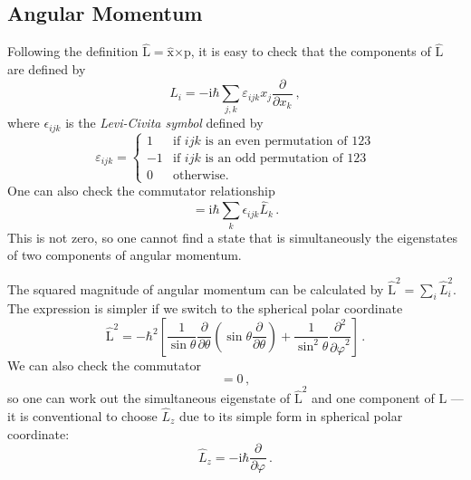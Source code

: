 \documentclass{article}
\theoremstyle{plain}\theoremheaderfont{\normalfont\itshape}\theorembodyfont{\rmfamily}\theoremseparator{.}\newtheorem*{rem}{Remark}\newtheorem*{ex}{Example}\newtheorem*{proof}{Proof}\newtheorem*{altp}{Alternative proof}
\theoremstyle{plain}\theoremheaderfont{\normalfont\bfseries}\theorembodyfont{\rmfamily}\theoremseparator{.}\newtheorem{thm}{Theorem}[section]\newtheorem{lem}[thm]{Lemma}\newtheorem{prop}[thm]{Proposition}\newtheorem*{cor}{Corollary}\newtheorem{defn}[thm]{Definition}\newtheorem{clm}[thm]{Claim}\newtheorem{clminproof}{Claim}
\theoremstyle{break}\theoremheaderfont{\normalfont\itshape}\theorembodyfont{\rmfamily}\theoremseparator{.\medskip}\newtheorem*{proofskip}{Proof}\newtheorem*{exs}{Examples}\newtheorem*{rems}{Remarks}
\theoremstyle{break}\theoremheaderfont{\normalfont\bfseries}\theorembodyfont{\rmfamily}\theoremseparator{.\medskip}\newtheorem{lemskip}[thm]{Lemma}\newtheorem{defnskip}[thm]{Definition}\newtheorem{propskip}[thm]{Proposition}\newtheorem{thmskip}[thm]{Theorem}
\numberwithin{equation}{section}
\newcommand{\ii}{\mathrm{i}}
\newcommand{\pdv}[3][]{\frac{\partial^{#1} #2}{{\partial #3}^{#1}}}
\newcommand{\vb}[1]{\bm{\mathrm{#1}}}
\newcommand{\cross}{\bm{\times}}
\begin{document}
    \subsection{Angular Momentum}
    Following the definition \(\hat{\vb{L}}=\hat{\vb{x}}\cross\vb{\vb{p}}\), it is easy to check that the components of \(\hat{\vb{L}}\) are defined by
    \begin{equation}
        \hat{L}_i=-\ii\hbar\sum_{j,k}\varepsilon_{ijk}x_j\pdv{}{x_k}\,,
    \end{equation}
    where \(\epsilon_{ijk}\) is the \textit{Levi-Civita symbol} defined by
    \begin{equation}
        \varepsilon_{ijk}=\begin{cases}
            1 & \text{if }ijk\text{ is an even permutation of }123 \\
            -1 & \text{if }ijk\text{ is an odd permutation of }123 \\
            0 & \text{otherwise.}
        \end{cases}
    \end{equation}
    One can also check the commutator relationship
    \begin{equation}
        [\hat{L}_i,\hat{L}_j]=\ii\hbar\sum_{k}\epsilon_{ijk} \hat{L}_k\,.
    \end{equation}
    This is not zero, so one cannot find a state that is simultaneously the eigenstates of two components of angular momentum.
    
    The squared magnitude of angular momentum can be calculated by \(\hat{\vb{L}}^2=\sum_i \hat{L}_i^2\). The expression is simpler if we switch to the spherical polar coordinate
    \begin{equation}\label{J_squared}
        \hat{\vb{L}}^2=-\hbar^2\left[\frac{1}{\sin\theta}\pdv{}{\theta}\left(\sin\theta\pdv{}{\theta}\right) + \frac{1}{\sin^2\theta}\pdv[2]{}{\varphi}\right]\,.
    \end{equation}
    We can also check the commutator
    \begin{equation}
        [\hat{\vb{L}}^2,\hat{L}_i]=0\,,
    \end{equation}
    so one can work out the simultaneous eigenstate of \(\hat{\vb{L}}^2\) and one component of \(\vb{L}\) --- it is conventional to choose \(\hat{L}_z\) due to its simple form in spherical polar coordinate:
    \begin{equation}
        \hat{L}_z=-\ii\hbar\pdv{}{\varphi}\,.
    \end{equation}
\end{document}
